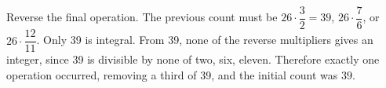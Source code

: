 Reverse the final operation. The previous count must be $26\cdot\dfrac{3}{2}=39$, $26\cdot\dfrac{7}{6}$, or $26\cdot\dfrac{12}{11}$. Only 39 is integral. From 39, none of the reverse multipliers gives an integer, since 39 is divisible by none of two, six, eleven. Therefore exactly one operation occurred, removing a third of 39, and the initial count was $\boxed{39}$.
